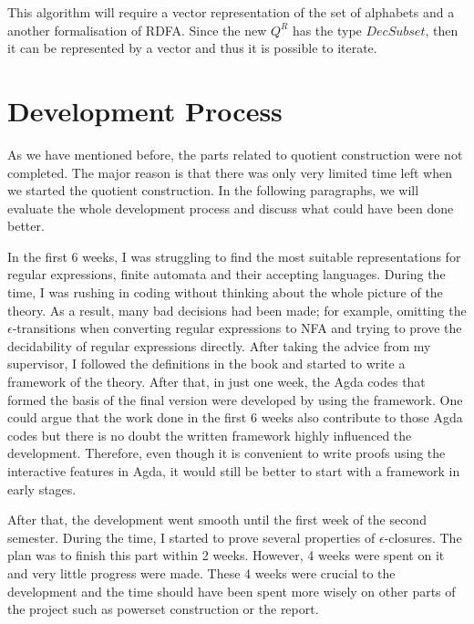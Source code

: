 \par This algorithm will require a vector representation of the set of
alphabets and a another formalisation of RDFA. Since the new \(Q^R\) has
the type \(DecSubset\), then it can be represented by a vector and
thus it is possible to iterate. 


\section{Development Process}
\par As we have mentioned before, the parts related to quotient
construction were not completed. The major reason is
that there was only very limited time left when we started the quotient
construction. In the following paragraphs, we will evaluate the whole
development process and discuss what could have been done better. 

\par In the first 6 weeks, I was struggling to find
the most suitable representations for regular expressions, finite
automata and their accepting languages. During the time, I was
rushing in coding without thinking about the whole picture of
the theory. As a result, many bad decisions had been made; for example, omitting the
\(\epsilon\)-transitions when converting regular expressions to NFA and trying to prove
the decidability of regular expressions directly. After taking the
advice from my supervisor, I followed the definitions in the
book \cite{aho1972} and started to write a framework of the
theory. After that, in just one week, the Agda
codes that formed the basis of the final version were developed by
using the framework. One could argue that the work
done in the first 6 weeks also contribute to those Agda codes but
there is no doubt the written framework highly influenced the
development. Therefore, even though it is convenient to write proofs
using the interactive features in Agda,
it would still be better to start with a framework in early stages. 

\par After that, the development went smooth until the first week of
the second semester. During the time, I started to prove several
properties of \(\epsilon\)-closures. The plan was to finish this part
within 2 weeks. However, 4 weeks were spent on it and very little
progress were made. These 4 weeks were crucial to the development and
the time should have been spent more wisely on other parts of the
project such as powerset construction or the report. 


